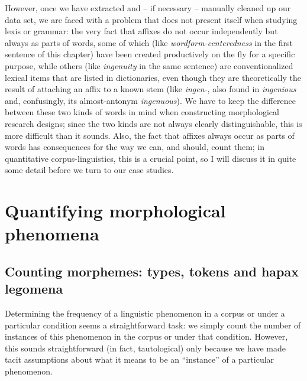 However, once we have extracted  and -- if necessary -- manually  cleaned up our data set, we are faced with a problem that does not present itself when studying lexis or grammar:  the very fact that affixes  do not occur independently but always as parts of words, some of which (like \textit{wordform-centeredness} in the first sentence of this chapter) have been created productively  on the fly for a specific purpose, while others (like \textit{ingenuity} in the same sentence) are conventionalized  lexical items that are listed in dictionaries,  even though they are theoretically the result of attaching an affix  to a known stem  (like \textit{ingen-}, also found in \textit{ingenious} and, confusingly, its almost\hyp{}antonym  \textit{ingenuous}). We have to keep the difference between these two kinds of words in mind when constructing morphological  research designs;  since the two kinds are not always clearly distinguishable, this is more difficult than it sounds. Also, the fact that affixes  always occur as parts of words has consequences for the way we can, and should, count them; in quantitative  corpus\hyp{}linguistics, this is a crucial point, so I will discuss it in quite some detail before we turn to our case studies.

\section{Quantifying morphological phenomena}
\label{sec:quantifyingmorphologicalphenomena}

\subsection{Counting morphemes: types, tokens and hapax legomena}
\label{sec:countingmorphemes}

Determining the frequency  of a linguistic phenomenon in a corpus or under a particular condition seems a straightforward task: we simply count the number of instances of this phenomenon in the corpus or under that condition. However, this sounds straightforward (in fact, tautological) only because we have made tacit assumptions about what it means to be an ``instance'' of a particular phenomenon.

